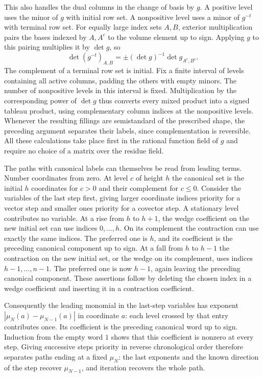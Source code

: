 \documentclass[11pt]{amsart}
\theoremstyle{definition}
\theoremstyle{remark}
\begin{document}
This also handles the dual columns in the change of basis by $g$.
A positive level uses the minor of $g$ with initial row set. A
nonpositive level uses a minor of $g^{-t}$ with terminal row set.
For equally large index sets $A,B$, exterior multiplication
pairs the bases indexed by $A,A^c$ to the volume element up to
sign. Applying $g$ to this pairing multiplies it by $\det g$, so
\[
 \det (g^{-t})_{A,B}
 =\pm(\det g)^{-1}\det g_{A^c,B^c}.
\]
The complement of a terminal row set is initial. Fix a finite
interval of levels containing all active columns, padding the
others with empty minors. The number of nonpositive levels in
this interval is fixed. Multiplication by the corresponding power
of $\det g$ thus converts every mixed product into a signed
tableau product, using complementary column indices at the
nonpositive levels. Whenever the resulting fillings are
semistandard of the prescribed shape, the preceding argument
separates their labels, since complementation is reversible.
All these calculations take place first in the rational function
field of $g$ and require no choice of a matrix over the residue
field.

The paths with canonical labels can themselves be read from leading
terms. Number coordinates from zero. At level $c$ of height $h$ the
canonical set is the initial $h$ coordinates for $c>0$ and their
complement for $c\le0$. Consider the variables of the last step
first, giving larger coordinate indices priority for a vector step
and smaller ones priority for a covector step. A stationary level
contributes no variable. At a rise from $h$ to $h+1$, the wedge
coefficient on the new initial set can use indices $0,\ldots,h$.
On its complement the contraction can use exactly the same indices.
The preferred one is $h$, and its coefficient is the preceding
canonical component up to sign. At a fall from $h$ to $h-1$ the
contraction on the new initial set, or the wedge on its complement,
uses indices $h-1,\ldots,n-1$. The preferred one is now $h-1$,
again leaving the preceding canonical component. These assertions
follow by deleting the chosen index in a wedge coefficient and
inserting it in a contraction coefficient.

Consequently the leading monomial in the last-step variables has
exponent $|\mu_N(a)-\mu_{N-1}(a)|$ in coordinate $a$: each level
crossed by that entry contributes once. Its coefficient is the
preceding canonical word up to sign. Induction from the empty
word $1$ shows that this coefficient is nonzero at every step.
Giving successive steps priority in reverse chronological order
therefore separates paths ending at a fixed $\mu_N$: the last
exponents and the known direction of the step recover $\mu_{N-1}$,
and iteration recovers the whole path.
\end{document}
